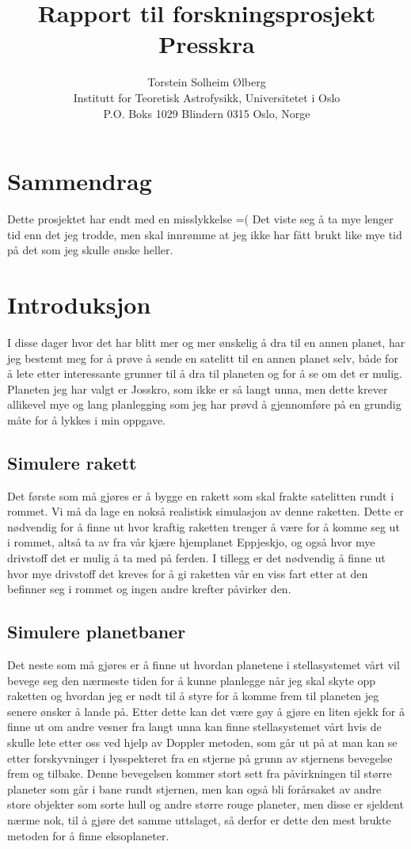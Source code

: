 \documentclass[11pt, A4paper, norsk]{report}
\author{Torstein Solheim Ølberg \\ Institutt for Teoretisk Astrofysikk, Universitetet i Oslo  \\ P.O. Boks 1029 Blindern 0315 Oslo, Norge}
\title{Rapport til forskningsprosjekt Presskra}
\begin{document}
\maketitle
\tableofcontents


	\section{Sammendrag}
Dette prosjektet har endt med en misslykkelse =( Det viste seg å ta mye lenger tid enn det jeg trodde, men skal innrømme at jeg ikke har fått brukt like mye tid på det som jeg skulle ønske heller. 


	\section{Introduksjon}
I disse dager hvor det har blitt mer og mer ønskelig å dra til en annen planet, har jeg bestemt meg for å prøve å sende en satelitt til en annen planet selv, både for å lete etter interessante grunner til å dra til planeten og for å se om det er mulig. Planeten jeg har valgt er Josskro, som ikke er så langt unna, men dette krever allikevel mye og lang planlegging som jeg har prøvd å gjennomføre på en grundig måte for å lykkes i min oppgave.

		\subsection{Simulere rakett}
Det første som må gjøres er å bygge en rakett som skal frakte satelitten rundt i rommet. Vi må da lage en nokså realistisk simulasjon av denne raketten. Dette er nødvendig for å finne ut hvor kraftig raketten trenger å være for å komme seg ut i rommet, altså ta av fra vår kjære hjemplanet Eppjeskjo, og også hvor mye drivstoff det er mulig å ta med på ferden. I tillegg er det nødvendig å finne ut hvor mye drivstoff det kreves for å gi raketten vår en viss fart etter at den befinner seg i rommet og ingen andre krefter påvirker den.

		\subsection{Simulere planetbaner}
Det neste som må gjøres er å finne ut hvordan planetene i stellasystemet vårt vil bevege seg den nærmeste tiden for å kunne planlegge når jeg skal skyte opp raketten og hvordan jeg er nødt til å styre for å komme frem til planeten jeg senere ønsker å lande på.
Etter dette kan det være gøy å gjøre en liten sjekk for å finne ut om andre vesner fra langt unna kan finne stellasystemet vårt hvis de skulle lete etter oss ved hjelp av Doppler metoden, som går ut på at man kan se etter forskyvninger i lysspekteret fra en stjerne på grunn av stjernens bevegelse frem og tilbake. Denne bevegelsen kommer stort sett fra påvirkningen til større planeter som går i bane rundt stjernen, men kan også bli forårsaket av andre store objekter som sorte hull og andre større rouge planeter, men disse er sjeldent nærme nok, til å gjøre det samme uttslaget, så derfor er dette den mest brukte metoden for å finne eksoplaneter.
\end{document}

